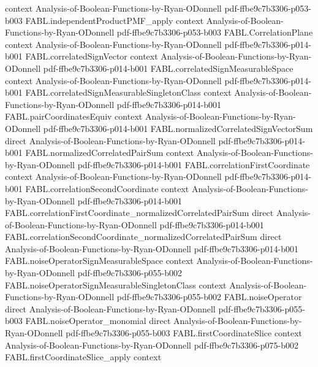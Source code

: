 \begin{theorem}
  {context}
  {Analysis-of-Boolean-Functions-by-Ryan-ODonnell}
  {pdf-ffbe9c7b3306-p053-b003}
\proofstep
  {FABL.independentProductPMF_apply}
  {context}
  {Analysis-of-Boolean-Functions-by-Ryan-ODonnell}
  {pdf-ffbe9c7b3306-p053-b003}
\proofstep
  {FABL.CorrelationPlane}
  {context}
  {Analysis-of-Boolean-Functions-by-Ryan-ODonnell}
  {pdf-ffbe9c7b3306-p014-b001}
\proofstep
  {FABL.correlatedSignVector}
  {context}
  {Analysis-of-Boolean-Functions-by-Ryan-ODonnell}
  {pdf-ffbe9c7b3306-p014-b001}
\proofstep
  {FABL.correlatedSignMeasurableSpace}
  {context}
  {Analysis-of-Boolean-Functions-by-Ryan-ODonnell}
  {pdf-ffbe9c7b3306-p014-b001}
\proofstep
  {FABL.correlatedSignMeasurableSingletonClass}
  {context}
  {Analysis-of-Boolean-Functions-by-Ryan-ODonnell}
  {pdf-ffbe9c7b3306-p014-b001}
\proofstep
  {FABL.pairCoordinatesEquiv}
  {context}
  {Analysis-of-Boolean-Functions-by-Ryan-ODonnell}
  {pdf-ffbe9c7b3306-p014-b001}
\proofstep
  {FABL.normalizedCorrelatedSignVectorSum}
  {direct}
  {Analysis-of-Boolean-Functions-by-Ryan-ODonnell}
  {pdf-ffbe9c7b3306-p014-b001}
\proofstep
  {FABL.normalizedCorrelatedPairSum}
  {context}
  {Analysis-of-Boolean-Functions-by-Ryan-ODonnell}
  {pdf-ffbe9c7b3306-p014-b001}
\proofstep
  {FABL.correlationFirstCoordinate}
  {context}
  {Analysis-of-Boolean-Functions-by-Ryan-ODonnell}
  {pdf-ffbe9c7b3306-p014-b001}
\proofstep
  {FABL.correlationSecondCoordinate}
  {context}
  {Analysis-of-Boolean-Functions-by-Ryan-ODonnell}
  {pdf-ffbe9c7b3306-p014-b001}
\proofstep
  {FABL.correlationFirstCoordinate_normalizedCorrelatedPairSum}
  {direct}
  {Analysis-of-Boolean-Functions-by-Ryan-ODonnell}
  {pdf-ffbe9c7b3306-p014-b001}
\proofstep
  {FABL.correlationSecondCoordinate_normalizedCorrelatedPairSum}
  {direct}
  {Analysis-of-Boolean-Functions-by-Ryan-ODonnell}
  {pdf-ffbe9c7b3306-p014-b001}
\proofstep
  {FABL.noiseOperatorSignMeasurableSpace}
  {context}
  {Analysis-of-Boolean-Functions-by-Ryan-ODonnell}
  {pdf-ffbe9c7b3306-p055-b002}
\proofstep
  {FABL.noiseOperatorSignMeasurableSingletonClass}
  {context}
  {Analysis-of-Boolean-Functions-by-Ryan-ODonnell}
  {pdf-ffbe9c7b3306-p055-b002}
\proofstep
  {FABL.noiseOperator}
  {direct}
  {Analysis-of-Boolean-Functions-by-Ryan-ODonnell}
  {pdf-ffbe9c7b3306-p055-b003}
\proofstep
  {FABL.noiseOperator_monomial}
  {direct}
  {Analysis-of-Boolean-Functions-by-Ryan-ODonnell}
  {pdf-ffbe9c7b3306-p055-b003}
\proofstep
  {FABL.firstCoordinateSlice}
  {context}
  {Analysis-of-Boolean-Functions-by-Ryan-ODonnell}
  {pdf-ffbe9c7b3306-p075-b002}
\proofstep
  {FABL.firstCoordinateSlice_apply}
  {context}

\end{theorem}
